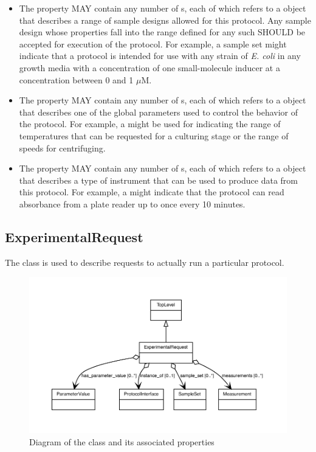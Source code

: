 \begin{itemize}
\item \label{sec:hasSampleSet}
The  property MAY contain any number of s, each of which refers to a  object that describes a range of sample designs allowed for this protocol.
Any sample design whose properties fall into the range defined for any such  SHOULD be accepted for execution of the protocol.
For example, a sample set might indicate that a protocol is intended for use with any strain of {\it E. coli} in any growth media with a concentration of one small-molecule inducer at a concentration between 0 and 1 $\mu$M.

\item \label{sec:hasParameter}
The  property MAY contain any number of s, each of which refers to a  object that describes one of the global parameters used to control the behavior of the protocol. 
For example, a  might be used for indicating the range of temperatures that can be requested for a culturing stage or the range of speeds for centrifuging.

\item \label{sec:hasMeasurementType}
The  property MAY contain any number of s, each of which refers to a  object that describes a type of instrument that can be used to produce data from this protocol.
For example, a  might indicate that the protocol can read absorbance from a plate reader up to once every 10 minutes.
\end{itemize}

\subsection{ExperimentalRequest}
\label{sec:ExperimentalRequest}

The  class is used to describe requests to actually run a particular protocol.

\begin{figure}[ht]
\begin{center}
\includegraphics[scale=0.8]{figures/ExperimentalRequest}
\caption[]{Diagram of the  class and its associated properties}
\label{uml:ExperimentRequest}
\end{center}
\end{figure}

